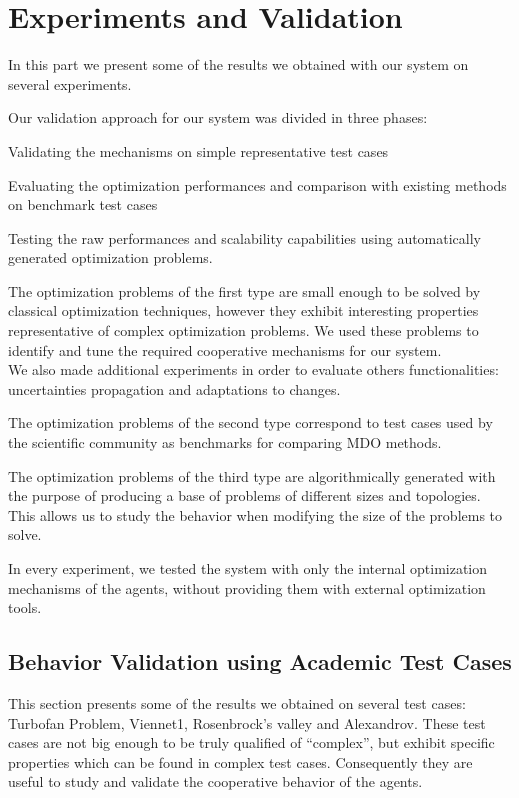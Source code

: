 \part{Experiments and Validation}

In this part we present some of the results we obtained with our system on several experiments.

Our validation approach for our system was divided in three phases:
\begin{compactitem}
\item Validating the mechanisms on simple representative test cases
\item Evaluating the optimization performances and comparison with existing methods on benchmark test cases
\item Testing the raw performances and scalability capabilities using automatically generated optimization problems.
\end{compactitem}

The optimization problems of the first type are small enough to be solved by classical optimization techniques, however they exhibit interesting properties representative of complex optimization problems. We used these problems to identify and tune the required cooperative mechanisms for our system.\\
We also made additional experiments in order to evaluate others functionalities: uncertainties propagation and adaptations to changes.

The optimization problems of the second type correspond to test cases used by the scientific community as benchmarks for comparing MDO methods.

The optimization problems of the third type are algorithmically generated with the purpose of producing a base of problems of different sizes and topologies. This allows us to study the behavior when modifying the size of the problems to solve.

In every experiment, we tested the system with only the internal optimization mechanisms of the agents, without providing them with external optimization tools.

\chapter{Behavior Validation using Academic Test Cases}

This section presents some of the results we obtained on several test cases: Turbofan Problem, Viennet1, Rosenbrock's valley and Alexandrov. These test cases are not big enough to be truly qualified of \enquote{complex}, but exhibit specific properties which can be found in complex test cases. Consequently they are useful to study and validate the cooperative behavior of the agents.

